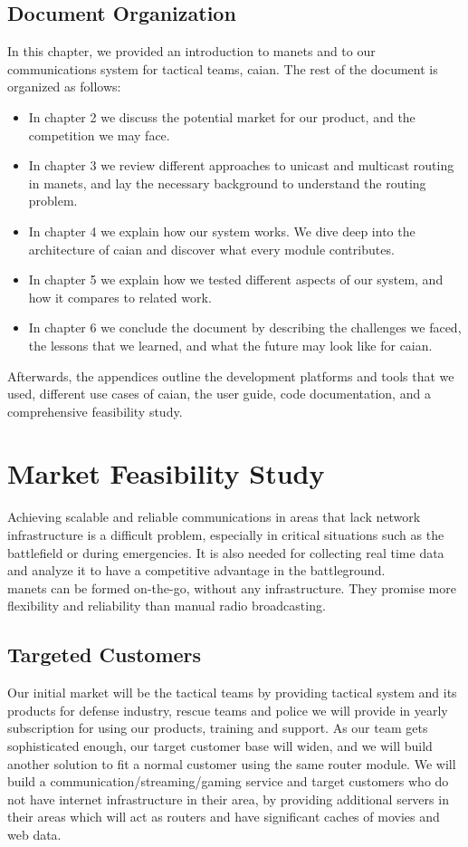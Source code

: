 \section{Document Organization}
In this chapter, we provided an introduction to \acrshort{manets} and to our communications system for tactical teams, \acrshort{caian}. The rest of the document is organized as follows:
\begin{itemize}[itemsep=1pt, topsep=5pt]
    \item In chapter 2 we discuss the potential market for our product, and the competition we may face.
    \item In chapter 3 we review different approaches to unicast and multicast routing in \acrshort{manets}, and lay the necessary background to understand the routing problem. 
    \item In chapter 4 we explain how our system works. We dive deep into the architecture of \acrshort{caian} and discover what every module contributes.
    \item In chapter 5 we explain how we tested different aspects of our system, and how it compares to related work.
    \item In chapter 6 we conclude the document by describing the challenges we faced, the lessons that we learned, and what the future may look like for \acrshort{caian}.
\end{itemize}

Afterwards, the appendices outline the development platforms and tools that we used, different use cases of \acrshort{caian}, the user guide, code documentation, and a comprehensive feasibility study.

\chapter{Market Feasibility Study}
Achieving scalable and reliable communications in areas that lack network infrastructure is a difficult problem, especially in critical situations such as the battlefield or during emergencies. It is also needed for collecting real time data and analyze it to have a competitive advantage in the battleground.
\\
\acrfull{manets} can be formed on-the-go, without any infrastructure. They promise more flexibility and reliability than manual radio broadcasting.
\\

\section{Targeted Customers}
Our initial market will be the tactical teams by providing tactical system and its products for defense industry, rescue teams and police we will provide in yearly subscription for using our products, training and support. As our team gets sophisticated enough, our target customer base will widen, and we will build another solution to fit a normal customer using the same router module. We will build a communication/streaming/gaming service and target customers who do not have internet infrastructure in their area, by providing additional servers in their areas which will act as routers and have significant caches of movies and web data.

